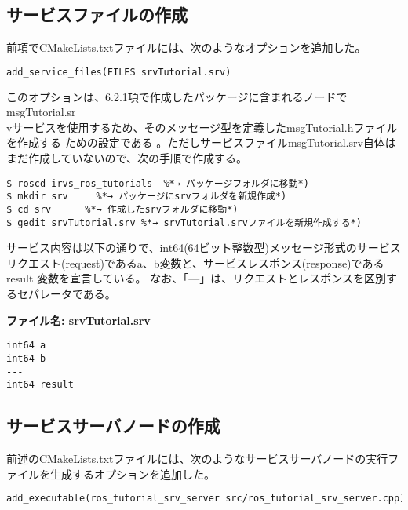 \subsection{サービスファイルの作成}

前項でCMakeLists.txtファイルには、次のようなオプションを追加した。

\begin{lstlisting}[language=make]
add_service_files(FILES srvTutorial.srv)
\end{lstlisting}

このオプションは、6.2.1項で作成したパッケージに含まれるノードでmsgTutorial.sr\\vサービスを使用するため、そのメッセージ型を定義したmsgTutorial.hファイルを作成する ための設定である 。ただしサービスファイルmsgTutorial.srv自体はまだ作成していないので、次の手順で作成する。

\begin{lstlisting}[language=ROS]
$ roscd irvs_ros_tutorials  %*→ パッケージフォルダに移動*)
$ mkdir srv     %*→ パッケージにsrvフォルダを新規作成*)
$ cd srv      %*→ 作成したsrvフォルダに移動*)
$ gedit srvTutorial.srv %*→ srvTutorial.srvファイルを新規作成する*)
\end{lstlisting}

サービス内容は以下の通りで、int64(64ビット整数型)メッセージ形式のサービスリクエスト(request)であるa、b変数と、サービスレスポンス(response)であるresult  変数を宣言している。 なお、「---」は、リクエストとレスポンスを区別するセパレータである。

\noindent\textbf{ファイル名: srvTutorial.srv}
\begin{lstlisting}[language=ROS]
int64 a
int64 b
---
int64 result
\end{lstlisting}

\subsection{サービスサーバノードの作成}
前述のCMakeLists.txtファイルには、次のようなサービスサーバノードの実行ファイルを生成するオプションを追加した。

\begin{lstlisting}[language=make]
add_executable(ros_tutorial_srv_server src/ros_tutorial_srv_server.cpp)
\end{lstlisting}

